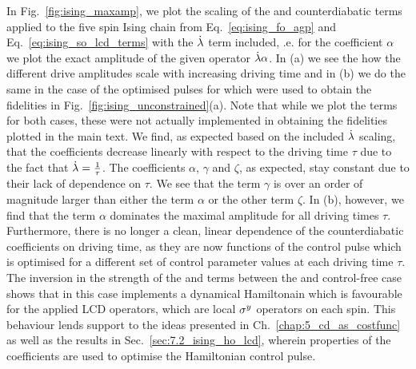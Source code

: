 In Fig.~\ref{fig:ising_maxamp}, we plot the scaling of the  and  counterdiabatic terms applied to the five spin Ising chain from Eq.~\eqref{eq:ising_fo_agp} and Eq.~\eqref{eq:ising_so_lcd_terms} with the $\dot{\lambda}$ term included, \@i.e. for the coefficient $\alpha$ we plot the exact  amplitude of the given  operator $\dot{\lambda} \alpha$. In (a) we see the how the different  drive amplitudes scale with increasing driving time and in (b) we do the same in the case of the optimised pulses for  which were used to obtain the fidelities in Fig.~\ref{fig:ising_unconstrained}(a). Note that while we plot the  terms for both cases, these were not actually implemented in obtaining the fidelities plotted in the main text. We find, as expected based on the included $\dot{\lambda}$ scaling, that the  coefficients decrease linearly with respect to the driving time $\tau$ due to the fact that $\dot{\lambda} = \frac{1}{\tau}$. The coefficients $\alpha$, $\gamma$ and $\zeta$, as expected, stay constant due to their lack of dependence on $\tau$. We see that the  term $\gamma$ is over an order of magnitude larger than either the  term $\alpha$ or the other  term $\zeta$. In (b), however, we find that the  term $\alpha$ dominates the maximal amplitude for all driving times $\tau$. Furthermore, there is no longer a clean, linear dependence of the counterdiabatic coefficients on driving time, as they are now functions of the control pulse which is optimised for a different set of control parameter values at each driving time $\tau$. The inversion in the strength of the  and   terms between the  and control-free case shows that in this case  implements a dynamical Hamiltonain which is favourable for the applied LCD operators, which are local $\sigma^y$ operators on each spin. This behaviour lends support to the ideas presented in Ch.~\ref{chap:5_cd_as_costfunc} as well as the results in Sec.~\ref{sec:7.2_ising_ho_lcd}, wherein properties of the  coefficients are used to optimise the Hamiltonian control pulse.

